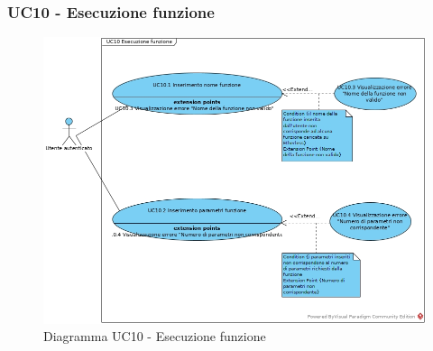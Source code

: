 \subsubsection{UC10 - Esecuzione funzione}
\begin{figure}[h]
	\centering
	\includegraphics[width=\linewidth]{res/img/UC10.jpg}
	\caption{Diagramma UC10 - Esecuzione funzione}
\end{figure}
